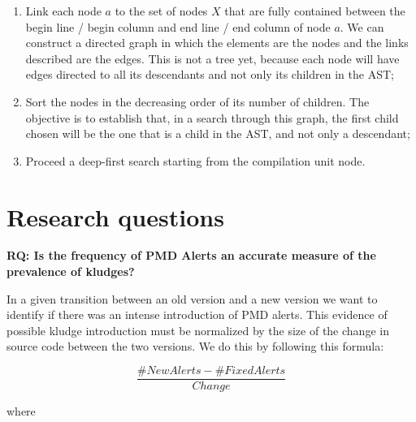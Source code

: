 \documentclass[
]{article}
\begin{document}
\begin{enumerate}
\item
  Link each node \(a\) to the set of nodes \(X\) that are fully
  contained between the begin line / begin column and end line / end
  column of node \(a\). We can construct a directed graph in which
  the elements are the nodes and the links described are the edges. This
  is not a tree yet, because each node will have edges directed to all
  its descendants and not only its children in the AST;

\item
  Sort the nodes in the decreasing order of its number of children. The
  objective is to establish that, in a search through this graph, the
  first child chosen will be the one that is a child in the AST, and not
  only a descendant;

\item
  Proceed a deep-first search starting from the compilation unit node.
\end{enumerate}


%
%

\section{Research questions}
\label{as_whole}

\noindent
\textbf{RQ: Is the frequency of PMD Alerts an accurate measure of the prevalence of kludges?}
\label{PMD_Kludge}

In a given transition between an old version and a new version we want
to identify if there was an intense introduction of PMD alerts. 
This evidence of possible kludge introduction must be normalized by the size
of the change in source code between the two versions. We do this by
following this formula:

%
%
%
%

\[ \frac{\#NewAlerts - \#FixedAlerts}{Change}    \]

where
\end{document}
